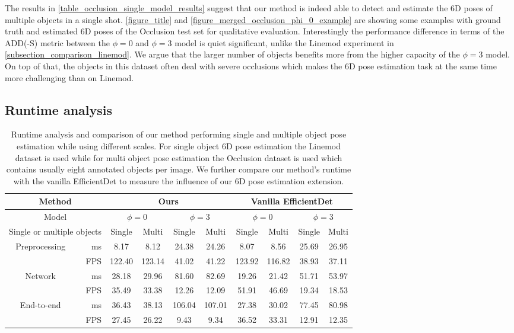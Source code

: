 \documentclass[twocolumn, 10pt, letterpaper]{article}
\begin{document}
 The results in \autoref{table_occlusion_single_model_results} suggest that our method is indeed able to detect and estimate the 6D poses of multiple objects in a single shot. \autoref{figure_title} and \autoref{figure_merged_occlusion_phi_0_example} are showing some examples with ground truth and estimated 6D poses of the Occlusion test set for qualitative evaluation. Interestingly the performance difference in terms of the ADD(-S) metric between the $\phi = 0$ and $\phi = 3$ model is quiet significant, unlike the Linemod experiment in \autoref{subsection_comparison_linemod}. We argue that the larger number of objects benefits more from the higher capacity of the $\phi = 3$ model. On top of that, the objects in this dataset often deal with severe occlusions which makes the 6D pose estimation task at the same time more challenging than on Linemod.

\subsection{Runtime analysis}
\label{subsection_runtime_analysis}

\begin{table*}
\centering
\begin{tabular}{ | c  r | c  c | c  c | c  c | c  c |}
 \hline
 \multicolumn{2}{|c|}{Method} & \multicolumn{4}{c|}{\textbf{Ours}} & \multicolumn{4}{c|}{{Vanilla EfficientDet\cite{EfficientDet}}}\\
 \hline
 \multicolumn{2}{|c|}{Model} & \multicolumn{2}{c|}{$\phi = 0$} & \multicolumn{2}{c|}{{$\phi = 3$}} & \multicolumn{2}{c|}{$\phi = 0$} & \multicolumn{2}{c|}{$\phi = 3$} \\
 \hline
	\multicolumn{2}{|c|}{Single or multiple objects}  & Single & Multi & Single & Multi & Single & Multi & Single & Multi \\
 \hline
 \multirow{2}{*}{Preprocessing} & ms & 8.17 & 8.12 & 24.38 & 24.26 & 8.07 & 8.56 & 25.69 & 26.95 \\
																& FPS & 122.40 & 123.14 & 41.02 & 41.22 & 123.92 & 116.82 & 38.93 & 37.11 \\
 \hline
 \multirow{2}{*}{Network} & ms & 28.18 & 29.96 & 81.60 & 82.69 & 19.26 & 21.42 & 51.71 & 53.97 \\
													& FPS & 35.49 & 33.38 & 12.26 & 12.09 & 51.91 & 46.69 & 19.34 & 18.53 \\
 \hline
 \multirow{2}{*}{End-to-end} 	& ms & 36.43 & 38.13 & 106.04 & 107.01 & 27.38 & 30.02 & 77.45 & 80.98 \\
															& FPS & 27.45 & 26.22 & 9.43 & 9.34 & 36.52 & 33.31 & 12.91 & 12.35 \\
 \hline
\end{tabular}
\caption{Runtime analysis and comparison of our method performing single and multiple object pose estimation while using different scales. For single object 6D pose estimation the Linemod dataset is used while for multi object pose estimation the Occlusion dataset is used which contains usually eight annotated objects per image. We further compare our method's runtime with the vanilla EfficientDet\cite{EfficientDet} to measure the influence of our 6D pose estimation extension.}
\label{table_runtime_analysis}
\end{table*}
\end{document}
